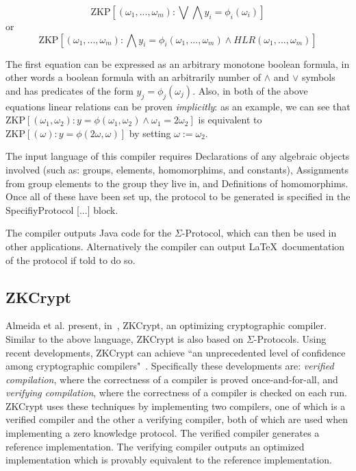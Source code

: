 \documentclass{sig-alternate}
\begin{document}
		\begin{equation*}
		\text{ZKP}[(\omega_{1},...,\omega_{m}):\bigvee\bigwedge y_{i} = \phi_{i}(\omega_{i})]
		\end{equation*}
		or
		\begin{equation*}
		\text{ZKP}[(\omega_{1},...,\omega_{m}):\bigwedge y_{i} = \phi_{i}(\omega_{1},...,\omega_{m})\land HLR(\omega_{1},...,\omega_{m})]
		\end{equation*}
		
		The first equation can be expressed
		as an arbitrary monotone boolean formula, in other words a boolean formula
		with an arbitrarily number of $\land$ and $\lor$ symbols and has predicates of
		the form $y_{j} = \phi_{j}(\omega_{j}).$ Also, in both of the above equations
		linear relations can be proven \textit{implicitly}: as an example, we can
		see that $\text{ZKP}[(\omega_{1},\omega_{2}):y = \phi(\omega_{1},\omega_{2}) \land \omega_{1} = 2\omega_{2}]$
		is equivalent to $\text{ZKP}[(\omega):y = \phi(2\omega,\omega)]$ by setting $\omega:=\omega_{2}$.
		
		The input language of this compiler requires Declarations of any
		algebraic objects involved (such as: groups, elements, homomorphims, and
		constants), Assignments from group elements to the group
		they live in, and Definitions of homomorphims. Once all of these
		have been set up, the protocol to be generated is specified in the
		SpecifiyProtocol [...] block.
		
		The compiler outputs Java code for the $\Sigma$-Protocol, which
		can then be used in other applications. Alternatively the compiler
		can output \LaTeX~documentation of the protocol if told to do so.
		
	\subsection{ZKCrypt}
		Almeida et al. present, in~\cite{ZKCrypt:2012}, ZKCrypt, an optimizing cryptographic
		compiler. Similar to the above language, ZKCrypt is also based on $\Sigma$-Protocols.
		Using recent developments, ZKCrypt can achieve ``an unprecedented level of confidence
		among cryptographic compilers"~\cite{ZKCrypt:2012}. Specifically these developments are:
		\textit{verified compilation}, where the correctness of a compiler is proved once-and-for-all,
		and \textit{verifying compilation}, where the correctness of a compiler is checked on
		each run. ZKCrypt uses these techniques by implementing two compilers, one of which
		is a verified compiler and the other a verifying compiler, both of which are used when
		implementing a zero knowledge protocol. The verified compiler generates
		a reference implementation. The verifying compiler outputs an optimized implementation
		which is provably equivalent to the reference implementation. 
		
\end{document}
